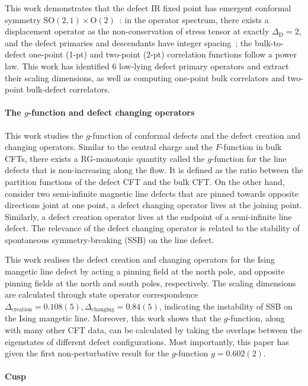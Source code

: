 \documentclass{timesjhep}
\begin{document}
This work demonstrates that the defect IR fixed point has emergent conformal symmetry $\mathrm{SO}(2,1)\times\mathrm{O}(2)$~: in the operator spectrum, there exists a displacement operator as the non-conservation of stress tensor at exactly $\Delta_\mathrm{D}=2$, and the defect primaries and descendants have integer spacing~; the bulk-to-defect one-point (1-pt) and two-point (2-pt) correlation functions follow a power law. This work has identified 6 low-lying defect primary operators and extract their scaling dimensions, as well as computing one-point bulk correlators and two-point bulk-defect correlators. 

\paragraph{The $g$-function and defect changing operators~\cite{Zhou2024Jan}}

This work studies the $g$-function of conformal defects and the defect creation and changing operators. Similar to the central charge and the $F$-function in bulk CFTs, there exists a RG-monotonic quantity called the $g$-function for the line defects that is non-increasing along the flow. It is defined as the ratio between the partition functions of the defect CFT and the bulk CFT. On the other hand, consider two semi-infinite magnetic line defects that are pinned towards opposite directions joint at one point, a defect changing operator lives at the joining point. Similarly, a defect creation operator lives at the endpoint of a semi-infinite line defect. The relevance of the defect changing operator is related to the stability of spontaneous symmetry-breaking (SSB) on the line defect. 

This work realises the defect creation and changing operators for the Ising mangetic line defect by acting a pinning field at the north pole, and opposite pinning fields at the north and south poles, respectively. The scaling dimensions are calculated through state operator correspondence $\Delta_{\mathrm{creation}}=0.108(5),\Delta_{\mathrm{changing}}=0.84(5)$, indicating the instability of SSB on the Ising mangetic line. Moreover, this work shows that the $g$-function, along with many other CFT data, can be calculated by taking the overlaps between the eigenstates of different defect configurations. Most importantly, this paper has given the first non-perturbative result for the $g$-function $g=0.602(2)$. 

\paragraph{Cusp~\cite{Cuomo2024}}
\end{document}

